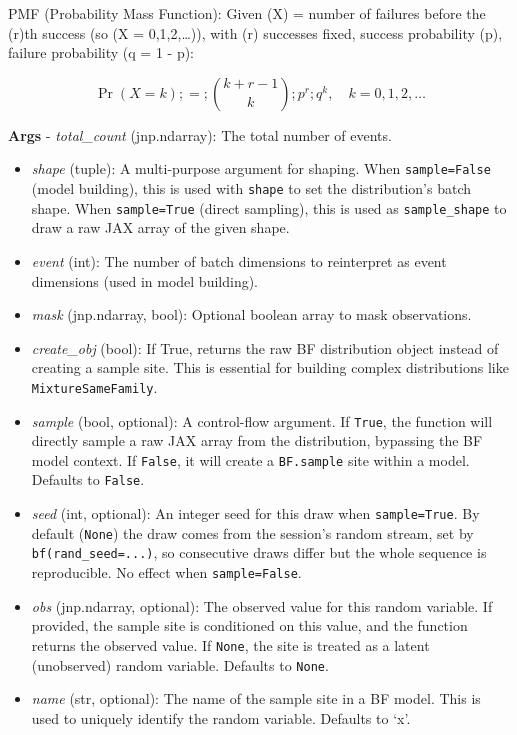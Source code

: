 \documentclass[
  letterpaper,
  DIV=11,
  numbers=noendperiod]{scrartcl}
\begin{document}
PMF (Probability Mass Function): Given (X) = number of failures before
the (r)th success (so (X = 0,1,2,\dots)), with (r) successes fixed,
success probability (p), failure probability (q = 1 - p):

\[
\Pr(X = k) ;=; \binom{k + r - 1}{k} ; p^r ; q^k, \quad k = 0,1,2,\dots
\]

\textbf{Args} - \emph{total\_count} (jnp.ndarray): The total number of
events.

\begin{itemize}
\item
  \emph{shape} (tuple): A multi-purpose argument for shaping. When
  \texttt{sample=False} (model building), this is used with
  \texttt{shape} to set the distribution's batch shape. When
  \texttt{sample=True} (direct sampling), this is used as
  \texttt{sample\_shape} to draw a raw JAX array of the given shape.
\item
  \emph{event} (int): The number of batch dimensions to reinterpret as
  event dimensions (used in model building).
\item
  \emph{mask} (jnp.ndarray, bool): Optional boolean array to mask
  observations.
\item
  \emph{create\_obj} (bool): If True, returns the raw BF distribution
  object instead of creating a sample site. This is essential for
  building complex distributions like \texttt{MixtureSameFamily}.
\item
  \emph{sample} (bool, optional): A control-flow argument. If
  \texttt{True}, the function will directly sample a raw JAX array from
  the distribution, bypassing the BF model context. If \texttt{False},
  it will create a \texttt{BF.sample} site within a model. Defaults to
  \texttt{False}.
\item
  \emph{seed} (int, optional): An integer seed for this draw when
  \texttt{sample=True}. By default (\texttt{None}) the draw comes from
  the session's random stream, set by \texttt{bf(rand\_seed=...)}, so
  consecutive draws differ but the whole sequence is reproducible. No
  effect when \texttt{sample=False}.
\item
  \emph{obs} (jnp.ndarray, optional): The observed value for this random
  variable. If provided, the sample site is conditioned on this value,
  and the function returns the observed value. If \texttt{None}, the
  site is treated as a latent (unobserved) random variable. Defaults to
  \texttt{None}.
\item
  \emph{name} (str, optional): The name of the sample site in a BF
  model. This is used to uniquely identify the random variable. Defaults
  to `x'.
\end{itemize}
\end{document}
